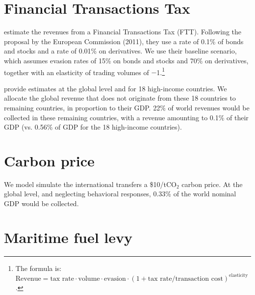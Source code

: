 \documentclass[12pt,english]{article}
\begin{document}
\section{Financial Transactions Tax}\label{sec:ftt}

\cite{pekanov_global_2019} estimate the revenues from a Financial Transactions Tax (FTT). Following the proposal by the European Commission (2011), they use a rate of 0.1\% of bonds and stocks and a rate of 0.01\% on derivatives. We use their baseline scenario, which assumes evasion rates of 15\% on bonds and stocks and 70\% on derivatives, together with an elasticity of trading volumes of $-$1.\footnote{The formula is: $\text{Revenue} = \text{tax rate} \cdot \text{volume} \cdot \text{evasion} \cdot \left(1 + \text{tax rate} / \text{transaction cost}\right)^\text{elasticity}$.} 

\cite{pekanov_global_2019} provide estimates at the global level and for 18 high-income countries. We allocate the global revenue that does not originate from these 18 countries to remaining countries, in proportion to their GDP. 22\% of world revenues would be collected in these remaining countries, with a revenue amounting to 0.1\% of their GDP (vs. 0.56\% of GDP for the 18 high-income countries).


\section{Carbon price}\label{sec:carbon}

We model simulate the international transfers a \$10/tCO$_\text{2}$ carbon price. At the global level, and neglecting behavioral responses, 0.33\% of the world nominal GDP would be collected. 

\section{Maritime fuel levy}\label{sec:wealth}
\end{document}
